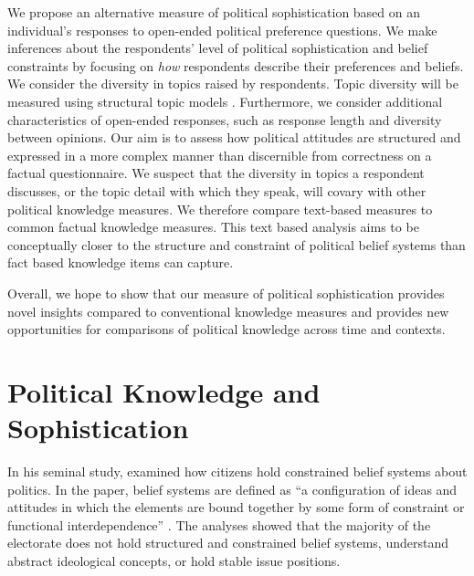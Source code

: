 \documentclass[12pt]{article}
\begin{document}
We propose an alternative measure of political sophistication based on an individual's responses to open-ended political preference questions. We make inferences about the respondents' level of political sophistication and belief constraints by focusing on 
\textit{how} respondents describe their preferences and beliefs. We consider the diversity in topics raised by respondents. Topic diversity will be measured using structural topic models 
\citep{roberts2014structural}. Furthermore, we consider additional characteristics of open-ended responses, such as response length and diversity between opinions. Our aim is to assess how political attitudes are structured and expressed in a more complex manner than discernible from correctness on a factual questionnaire. We suspect that the diversity in topics a respondent discusses, or the topic detail with which they speak, will covary with other political knowledge measures. We therefore compare text-based measures to common factual knowledge measures. This text based analysis aims to be conceptually closer to the structure and constraint of political belief systems 
\citep[see for example][]{tetlock1983cognitive,luskin1987measuring} than fact based knowledge items can capture.

Overall, we hope to show that our measure of political sophistication provides novel insights compared to conventional knowledge measures and provides new opportunities for comparisons of political knowledge across time and contexts.


\section{Political Knowledge and Sophistication}

In his seminal study, \citet{converse1964nature} examined how citizens hold constrained belief systems about politics. In the paper, belief systems are defined as ``a configuration of ideas and attitudes in which the elements are bound together by some form of constraint or functional interdependence'' \citep[207]{converse1964nature}. The analyses showed that the majority of the electorate does not hold structured and constrained belief systems, understand abstract ideological concepts, or hold stable issue positions. 
\end{document}
